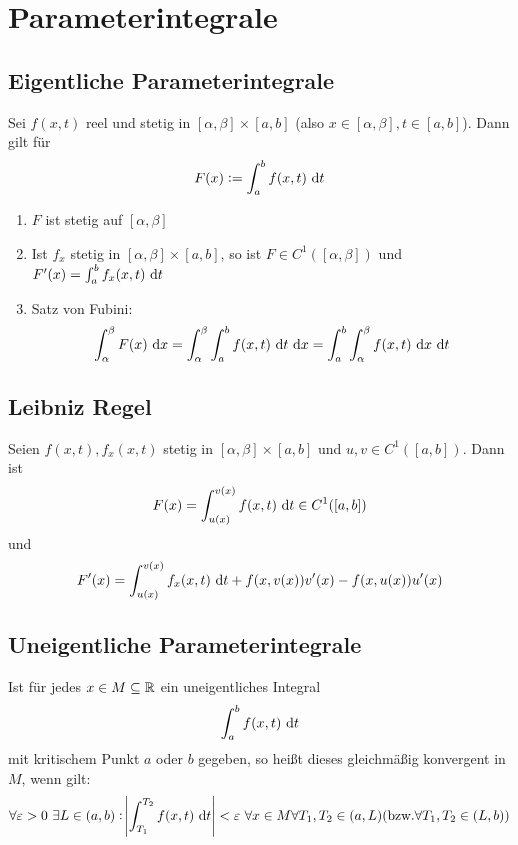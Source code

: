 \section{Parameterintegrale}
\subsection{Eigentliche Parameterintegrale}
Sei $f(x,t)$ reel und stetig in $[\alpha, \beta] \times [a,b]$ (also $x\in[\alpha, \beta],
t \in [a,b]$). Dann gilt für
\begin{equation*}
    F(x) := \int_a^b f(x,t) \text{ d}t
\end{equation*}
\begin{enumerate}[label= (\alph*)]
    \item $F$ ist stetig auf $[\alpha, \beta]$
    \item Ist $f_x$ stetig in $[\alpha, \beta] \times [a,b]$, so ist
        $F \in C^1([\alpha, \beta])$ und $F'(x) = \int_a^b f_x(x,t) \text{ d}t$
    \item Satz von Fubini:
        \begin{equation*}
            \int_\alpha^\beta F(x) \text{ d}x = \int_\alpha^\beta \int_a^b f(x,t) \text{ d}t \text{ d}x
            = \int_a^b \int_\alpha^\beta f(x,t) \text{ d}x \text{ d}t
        \end{equation*}
\end{enumerate}

\subsection{Leibniz Regel}
Seien $f(x,t), f_x(x,t)$ stetig in $[\alpha, \beta] \times [a,b]$ und
$u, v \in C^1 ( [a,b])$. Dann ist
\begin{equation*}
    F(x) = \int_{u(x)}^{v(x)} f(x,t) \text{ d}t \in C^1([a,b])
\end{equation*}
und
\begin{equation*}
    F'(x) = \int_{u(x)}^{v(x)} f_x(x,t) \text{ d}t +
    f(x, v(x)) v'(x) - f(x, u(x)) u'(x)
\end{equation*}

\subsection{Uneigentliche Parameterintegrale}
Ist für jedes $x \in M \subseteq \mathbb{R}$ ein uneigentliches Integral
\begin{equation*}
    \int_a^b f(x,t) \text{ d}t
\end{equation*}
mit kritischem Punkt $a$ oder $b$ gegeben, so heißt dieses gleichmäßig konvergent
in $M$, wenn gilt:
\begin{equation*}
    \forall \varepsilon > 0\ \exists L \in (a,b): \abs{\int_{T_1}^{T_2} f(x,t) \dt}
    <\varepsilon \ \forall x \in M \forall T_1, T_2 \in (a,L) (\text{bzw.}
    \forall T_1, T_2 \in (L,b))
\end{equation*}

